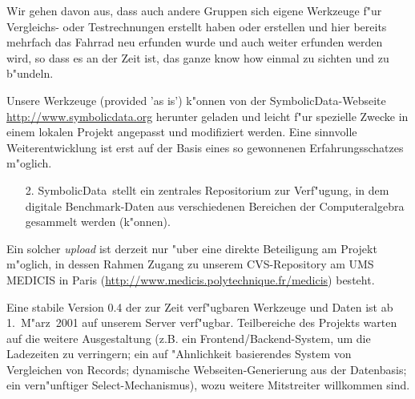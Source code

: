 \documentclass{article}
\newcommand{\SD}{{\sc Symbolic\-Data}}
\begin{document}
Wir gehen davon aus, dass auch andere Gruppen sich eigene Werkzeuge
f"ur Vergleichs- oder Testrechnungen erstellt haben oder erstellen und
hier bereits mehrfach das Fahrrad neu erfunden wurde und auch weiter
erfunden werden wird, so dass es an der Zeit ist, das ganze know how
einmal zu sichten und zu b"undeln.

Unsere Werkzeuge (provided 'as is') k"onnen von der \SD-Webseite
\url{http://www.symbolicdata.org} herunter geladen und leicht f"ur
spezielle Zwecke in einem lokalen Projekt angepasst und modifiziert
werden.  Eine sinnvolle Weiterentwicklung ist erst auf der Basis eines
so gewonnenen Erfahrungsschatzes m"oglich.

\begin{enumerate}
\item[2.] \SD\ stellt ein zentrales Repositorium zur Verf"ugung, in dem
digitale Benchmark-Daten aus verschiedenen Bereichen der
Computeralgebra gesammelt werden (k"onnen).
\end{enumerate}

Ein solcher {\em upload} ist derzeit nur "uber eine direkte Beteiligung
am Projekt m"oglich, in dessen Rahmen Zugang zu unserem CVS-Repository
am UMS MEDICIS in Paris
(\url{http://www.medicis.polytechnique.fr/medicis}) besteht.
\medskip

Eine stabile Version 0.4 der zur Zeit verf"ugbaren Werkzeuge und Daten
ist ab 1.~M"arz~2001 auf unserem Server verf"ugbar.  Teilbereiche des
Projekts warten auf die weitere Ausgestaltung (z.B. ein
Frontend/Backend-System, um die Ladezeiten zu verringern; ein auf
"Ahnlichkeit basierendes System von Vergleichen von Records; dynamische
Webseiten-Generierung aus der Datenbasis; ein vern"unftiger
Select-Mechanismus), wozu weitere Mitstreiter willkommen sind.
\end{document}
